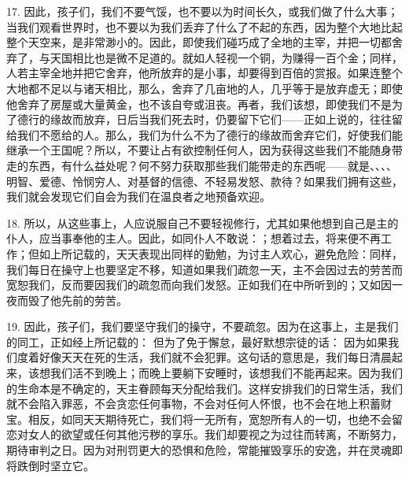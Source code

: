 17. 因此，孩子们，我们不要气馁，也不要以为时间长久，或我们做了什么大事； 当我们观看世界时，也不要以为我们丢弃了什么了不起的东西，因为整个大地比起整个天空来，是非常渺小的。因此，即使我们碰巧成了全地的主宰，并把一切都舍弃了，与天国相比也是微不足道的。就如人轻视一个铜，为赚得一百个金；同样，人若主宰全地并把它舍弃，他所放弃的是小事，却要得到百倍的赏报。如果连整个大地都不足以与诸天相比，那么，舍弃了几亩地的人，几乎等于是放弃虚无；即使他舍弃了房屋或大量黄金，也不该自夸或沮丧。再者，我们该想，即使我们不是为了德行的缘故而放弃，日后当我们死去时，仍要留下它们——正如上说的，往往留给我们不愿给的人。那么，我们为什么不为了德行的缘故而舍弃它们，好使我们能继承一个王国呢？所以，不要让占有欲控制任何人，因为获得这些我们不能随身带走的东西，有什么益处呢？何不努力获取那些我们能带走的东西呢——就是、、、、明智、爱德、怜悯穷人、对基督的信德、不轻易发怒、款待？如果我们拥有这些，我们就会发现它们自会为我们在温良者之地预备欢迎。\par

18. 所以，从这些事上，人应说服自己不要轻视修行，尤其如果他想到自己是主的仆人，应当事奉他的主人。因此，如同仆人不敢说：；想着过去，将来便不再工作；但如上所记载的，天天表现出同样的勤勉，为讨主人欢心，避免危险：同样，我们每日在操守上也要坚定不移，知道如果我们疏忽一天，主不会因过去的劳苦而宽恕我们，反而要因我们的疏忽而向我们发怒。正如我们在中所听到的；又如因一夜而毁了他先前的劳苦。\par

19. 因此，孩子们，我们要坚守我们的操守，不要疏忽。因为在这事上，主是我们的同工，正如经上所记载的： 但为了免于懈怠，最好默想宗徒的话： 因为如果我们度着好像天天在死的生活，我们就不会犯罪。这句话的意思是，我们每日清晨起来，该想我们活不到晚上；而晚上要躺下安睡时，该想我们不能再起来。因为我们的生命本是不确定的，天主眷顾每天分配给我们。这样安排我们的日常生活，我们就不会陷入罪恶，不会贪恋任何事物，不会对任何人怀恨，也不会在地上积蓄财宝。相反，如同天天期待死亡，我们将一无所有，宽恕所有人的一切，也绝不会留恋对女人的欲望或任何其他污秽的享乐。我们却要视之为过往而转离，不断努力，期待审判之日。因为对刑罚更大的恐惧和危险，常能摧毁享乐的安逸，并在灵魂即将跌倒时坚立它。\par

